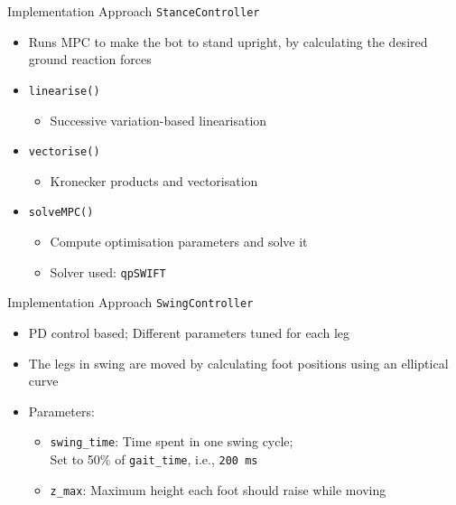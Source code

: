 \documentclass{beamer}
\begin{document}
\begin{frame}{Implementation Approach}
\texttt{StanceController}
\begin{itemize}
    \item Runs MPC to make the bot to stand upright, by calculating the desired ground reaction forces

    \item \texttt{linearise()}
    \begin{itemize}
        \item Successive variation-based linearisation
    \end{itemize}

    \item \texttt{vectorise()}
        \begin{itemize}
        \item Kronecker products and vectorisation
    \end{itemize}

    \item \texttt{solveMPC()}
    \begin{itemize}
        \item Compute optimisation parameters and solve it
        \item Solver used: \texttt{qpSWIFT}
    \end{itemize}
\end{itemize}
\end{frame}\normalfont

\begin{frame}{Implementation Approach}
\texttt{SwingController}
\begin{itemize}
    \item PD control based; Different parameters tuned for each leg
    \item The legs in swing are moved by calculating foot positions using an elliptical curve
    \item Parameters:
    \begin{itemize}
        \item \texttt{swing\_time}: Time spent in one swing cycle; \\
        Set to 50\% of \texttt{gait\_time}, i.e., \texttt{200 ms}
        \item \texttt{z\_max}: Maximum height each foot should raise while moving
    \end{itemize}
\end{itemize}
\end{frame}\normalfont
\end{document}
